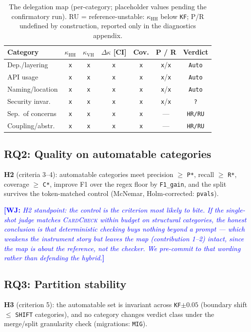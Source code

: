 \documentclass[conference]{IEEEtran}
\newcommand{\wj}[1]{\textcolor{blue}{\textbf{[WJ:} \textit{#1}\textbf{]}}}
\newcommand{\ph}[1]{\colorbox{yellow!35}{\texttt{\footnotesize #1}}}
\newcommand{\cardcheck}{\textsc{CardCheck}}
\newcommand{\kh}{\kappa_{\mathrm{HH}}}
\newcommand{\kv}{\kappa_{\mathrm{VH}}}
\newcommand{\dk}{\Delta\kappa}
\begin{document}
\begin{table}[t]
\caption{The delegation map (per-category; placeholder values pending the
confirmatory run). RU = reference-unstable: $\kh$ below \ph{KF}; P/R undefined
by construction, reported only in the diagnostics appendix.}
\label{tab:map}
\centering
\footnotesize
\begin{tabular}{@{}lcccccc@{}}
\toprule
Category & $\kh$ & $\kv$ & $\dk$ [CI] & Cov. & P / R & Verdict \\
\midrule
Dep./layering   & \ph{x} & \ph{x} & \ph{x} & \ph{x} & \ph{x}/\ph{x} & \ph{Auto} \\
API usage       & \ph{x} & \ph{x} & \ph{x} & \ph{x} & \ph{x}/\ph{x} & \ph{Auto} \\
Naming/location & \ph{x} & \ph{x} & \ph{x} & \ph{x} & \ph{x}/\ph{x} & \ph{Auto} \\
Security invar. & \ph{x} & \ph{x} & \ph{x} & \ph{x} & \ph{x}/\ph{x} & \ph{?} \\
Sep.\ of concerns & \ph{x} & \ph{x} & \ph{x} & \ph{x} & --- & \ph{HR/RU} \\
Coupling/abstr. & \ph{x} & \ph{x} & \ph{x} & \ph{x} & --- & \ph{HR/RU} \\
\bottomrule
\end{tabular}
\end{table}

\subsection{RQ2: Quality on automatable categories}
\textbf{H2} (criteria 3--4): automatable categories meet precision $\geq$
\ph{P*}, recall $\geq$ \ph{R*}, coverage $\geq$ \ph{C*}, improve F1 over the
regex floor by \ph{F1\_gain}, and the split survives the token-matched control
(McNemar, Holm-corrected: \ph{pvals}).

\wj{H2 standpoint: the control is the criterion most likely to bite. If the
single-shot judge matches \cardcheck{} within budget on structural categories,
the honest conclusion is that deterministic checking buys nothing beyond a
prompt --- which weakens the instrument story but leaves the map (contribution
1--2) intact, since the map is about the reference, not the checker. We
pre-commit to that wording rather than defending the hybrid.}

\subsection{RQ3: Partition stability}
\textbf{H3} (criterion 5): the automatable set is invariant across
\ph{KF}$\pm0.05$ (boundary shift $\leq$ \ph{SHIFT} categories), and no category
changes verdict class under the merge/split granularity check
(migrations: \ph{MIG}).
\end{document}
